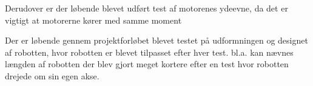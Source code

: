 Derudover er der løbende blevet udført test af motorenes ydeevne, da det er vigtigt at motorerne kører med samme moment

Der er løbende gennem projektforløbet blevet testet på udformningen og designet af robotten, hvor robotten er blevet tilpasset efter hver test. bl.a. kan nævnes længden af robotten der blev gjort meget kortere efter en test hvor robotten drejede om sin egen akse.